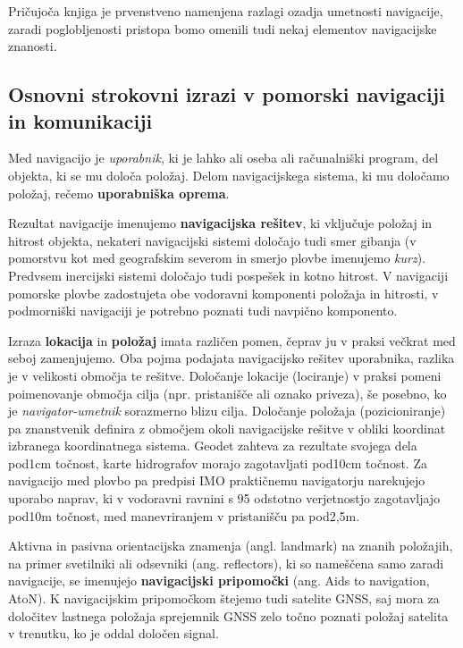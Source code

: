 Pričujoča knjiga je prvenstveno namenjena razlagi ozadja umetnosti navigacije, zaradi poglobljenosti pristopa bomo omenili tudi nekaj elementov navigacijske znanosti.

\subsection{Osnovni strokovni izrazi v pomorski navigaciji in komunikaciji}
\label{SubSec:OsnStrokIzrNav}

Med navigacijo je \textit{uporabnik}, ki je lahko ali oseba ali računalniški program, del objekta, ki se mu določa položaj. Delom navigacijskega sistema, ki mu določamo položaj, rečemo \textbf{uporabniška oprema}. 

Rezultat navigacije imenujemo \textbf{navigacijska rešitev}, ki vključuje položaj in hitrost objekta, nekateri navigacijski sistemi določajo tudi smer gibanja (v pomorstvu kot med geografskim severom in smerjo plovbe imenujemo \textit{kurz}). Predvsem inercijski sistemi določajo tudi pospešek in kotno hitrost. V navigaciji pomorske plovbe zadostujeta obe vodoravni komponenti položaja in hitrosti, v podmorniški navigaciji je potrebno poznati tudi navpično komponento.

Izraza \textbf{lokacija} in \textbf{položaj} imata različen pomen, čeprav ju v praksi večkrat med seboj zamenjujemo. Oba pojma podajata navigacijsko rešitev uporabnika, razlika je v velikosti območja te rešitve. Določanje lokacije (lociranje) v praksi pomeni poimenovanje območja cilja (npr. pristanišče ali oznako priveza), še posebno, ko je \textit{navigator-umetnik} sorazmerno blizu cilja. Določanje položaja (pozicioniranje) pa znanstvenik definira z območjem okoli navigacijske rešitve v obliki koordinat izbranega koordinatnega sistema. Geodet zahteva za rezultate svojega dela pod1cm točnost, karte hidrografov morajo zagotavljati pod10cm točnost. Za navigacijo med plovbo pa predpisi IMO praktičnemu navigatorju narekujejo uporabo naprav, ki v vodoravni ravnini s 95 odstotno verjetnostjo zagotavljajo pod10m točnost, med manevriranjem v pristanišču pa pod2,5m.


Aktivna in pasivna orientacijska znamenja (angl. landmark) na znanih položajih, na primer svetilniki ali odsevniki (ang. reflectors), ki so nameščena samo zaradi navigacije, se imenujejo \textbf{navigacijski pripomočki} (ang. Aids to navigation, AtoN). K navigacijskim pripomočkom štejemo tudi satelite GNSS, saj mora za določitev lastnega položaja sprejemnik GNSS zelo točno poznati položaj satelita v trenutku, ko je oddal določen signal.


